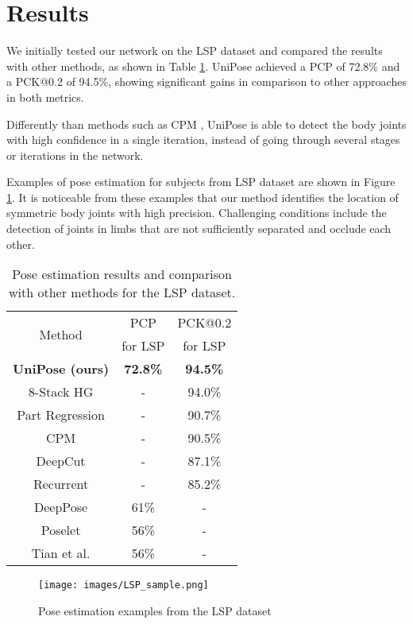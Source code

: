\documentclass[10pt,twocolumn,letterpaper]{article}
\begin{document}
\section{Results}
We initially tested our network on the LSP dataset and compared the results with other methods, as shown in Table \ref{tab:LSP}.
UniPose achieved a PCP of 72.8\% and a PCK@0.2 of 94.5\%,
showing significant gains in comparison to other approaches in both metrics.



Differently than methods such as CPM \cite{CPM}, UniPose is able to detect the body joints with high confidence in a single iteration, instead of going through several stages or iterations in the network.

Examples of pose estimation for subjects from LSP dataset are shown in Figure \ref{fig:LSP_detection}.
It is noticeable from these examples that our method identifies the location of symmetric body joints with high precision. 
Challenging conditions include the detection of joints in limbs that are not sufficiently separated and occlude each other.

\begin{table}[!ht]
\begin{center}
\begin{tabular}{|c|c|c|}
\hline
    \multirow{2}{*}{Method}&PCP&PCK@0.2\\
    &for LSP&for LSP\\
\hline\hline
    \textbf{UniPose (ours)}&\textbf{72.8\%}&\textbf{94.5\%}\\
    8-Stack HG \cite{zhang2019human}&-& 94.0\%\\
    Part Regression \cite{PartHeatRegression}&-&90.7\%\\
    CPM \cite{CPM}&-&90.5\%\\
    DeepCut \cite{DeepCut}&-&87.1\%\\
    Recurrent \cite{RecurrentPose}&-&85.2\%\\
    DeepPose \cite{DeepPose}&61\%&-\\
    Poselet \cite{Poselet}&56\%&-\\
    Tian et al.\cite{MixtureModels}&56\%&-\\
\hline
\end{tabular}
\end{center}
\caption{Pose estimation results and comparison with other methods 
for the
LSP dataset.
}
\label{tab:LSP}
\end{table}

\begin{figure}[htbp]
\begin{center}
\texttt{[image: images/LSP\_sample.png]}
\end{center}
  \caption{Pose estimation examples from the LSP dataset}
\label{fig:LSP_detection}
\end{figure}
\end{document}
